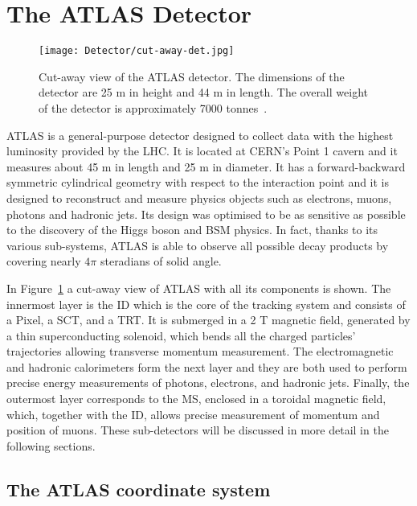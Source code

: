 	\section{The ATLAS Detector}
	\label{sec:det}

		\begin{figure}[!htb]
			\texttt{[image: Detector/cut-away-det.jpg]}
			\caption{Cut-away view of the \ac{ATLAS} detector. The dimensions of the detector are 25 m in height and 44 m in length. The overall weight of the detector is approximately 7000 tonnes~\cite{Lefevre2008}.}
			\label{fig:cut-away-det}
		\end{figure}


		\ac{ATLAS} is a general-purpose detector designed to collect data with the highest luminosity provided by the \ac{LHC}. It is located at \ac{CERN}'s Point 1 cavern and it measures about 45 m in length and 25 m in diameter. It has a forward-backward symmetric cylindrical geometry with respect to the interaction point and it is designed to reconstruct and measure physics objects such as electrons, muons, photons and hadronic jets. Its design was optimised to be as sensitive as possible to the discovery of the Higgs boson and \ac{BSM} physics. In fact, thanks to its various sub-systems, \ac{ATLAS} is able to observe all possible decay products by covering nearly $4\pi$ steradians of solid angle.

		In Figure~\ref{fig:cut-away-det} a cut-away view of \ac{ATLAS} with all its components is shown. The innermost layer is the \ac{ID} which is the core of the tracking system and consists of a Pixel, a \ac{SCT}, and a \ac{TRT}. It is submerged in a 2 T magnetic field, generated by a thin superconducting solenoid, which bends all the charged particles' trajectories allowing transverse momentum measurement. The electromagnetic and hadronic calorimeters form the next layer and they are both used to perform precise energy measurements of photons, electrons, and hadronic jets. Finally, the outermost layer corresponds to the \ac{MS}, enclosed in a toroidal magnetic field, which, together with the \ac{ID},  allows precise measurement of momentum and position of muons. These sub-detectors will be discussed in more detail in the following sections. 
	

		\subsection*{The ATLAS coordinate system}
		\label{par:coord}
			
